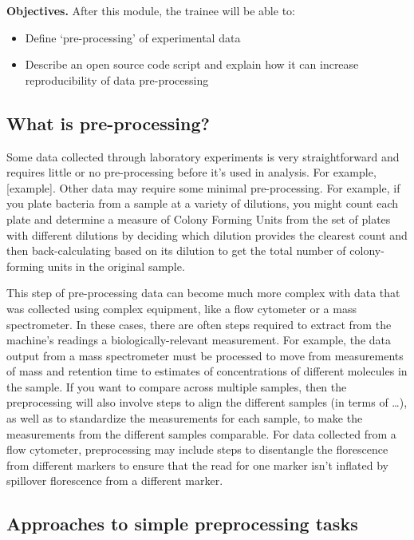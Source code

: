 \documentclass[]{tufte-book}
\providecommand{\tightlist}{%
  \setlength{\itemsep}{0pt}\setlength{\parskip}{0pt}}
\begin{document}
\textbf{Objectives.} After this module, the trainee will be able to:

\begin{itemize}
\tightlist
\item
  Define `pre-processing' of experimental data
\item
  Describe an open source code script and explain how it can increase
  reproducibility of data pre-processing
\end{itemize}

\hypertarget{what-is-pre-processing}{%
\subsection{What is pre-processing?}\label{what-is-pre-processing}}

Some data collected through laboratory experiments is very straightforward and
requires little or no pre-processing before it's used in analysis. For example,
{[}example{]}. Other data may require some minimal pre-processing. For example, if
you plate bacteria from a sample at a variety of dilutions, you might count each
plate and determine a measure of Colony Forming Units from the set of plates
with different dilutions by deciding which dilution provides the clearest count
and then back-calculating based on its dilution to get the total number of
colony-forming units in the original sample.

This step of pre-processing data can become much more complex with data that was
collected using complex equipment, like a flow cytometer or a mass spectrometer.
In these cases, there are often steps required to extract from the machine's
readings a biologically-relevant measurement. For example, the data output from
a mass spectrometer must be processed to move from measurements of mass and
retention time to estimates of concentrations of different molecules in the
sample. If you want to compare across multiple samples, then the preprocessing
will also involve steps to align the different samples (in terms of \ldots), as
well as to standardize the measurements for each sample, to make the
measurements from the different samples comparable. For data collected from a
flow cytometer, preprocessing may include steps to disentangle the florescence
from different markers to ensure that the read for one marker isn't inflated by
spillover florescence from a different marker.

\hypertarget{approaches-to-simple-preprocessing-tasks}{%
\subsection{Approaches to simple preprocessing tasks}\label{approaches-to-simple-preprocessing-tasks}}
\end{document}
